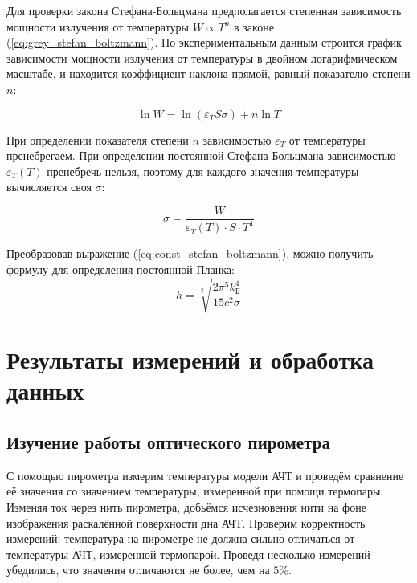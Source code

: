 \documentclass[a4paper, 12pt]{article}
\begin{document}
    Для проверки закона Стефана-Больцмана предполагается степенная зависимость мощности излучения от температуры $W \propto T^n$ в законе (\ref{eq:grey_stefan_boltzmann}). По экспериментальным данным строится график зависимости мощности излучения от температуры в двойном логарифмическом масштабе, и находится коэффициент наклона прямой, равный показателю степени $n$:
    
    \begin{equation}
        \ln W = \ln (\varepsilon_T S \sigma) + n \ln T
        \label{eq:lin_grey_stefan_boltzmann}
    \end{equation}
    
    При определении показателя степени $n$ зависимостью $\varepsilon_T$ от температуры пренебрегаем. При определении постоянной Стефана-Больцмана зависимостью $\varepsilon_T(T)$ пренебречь нельзя, поэтому для каждого значения температуры вычисляется своя $\sigma$:
    
    \begin{equation}
        \sigma = \frac{W}{\varepsilon_T(T) \cdot S \cdot T^4}
        \label{eq:calc_const_stefan_boltzman}
    \end{equation}
    
    Преобразовав выражение (\ref{eq:const_stefan_boltzmann}), можно получить формулу для определения постоянной Планка:
    \begin{equation}
        h = \sqrt[3]{\frac{2 \pi^5 k_Б^4}{15 c^2 \sigma}}
        \label{eq:calc_const_planck}
    \end{equation}

    \newpage
	
    \section{Результаты измерений и обработка данных}

    \subsection{Изучение работы оптического пирометра}

    С помощью пирометра измерим температуры модели АЧТ и проведём сравнение её значения со значением температуры, измеренной при помощи термопары. Изменяя ток через нить пирометра, добьёмся исчезновения нити на фоне изображения раскалённой поверхности дна АЧТ. Проверим корректность измерений: температура на пирометре не должна сильно отличаться от температуры АЧТ, измеренной термопарой. Проведя несколько измерений убедились, что значения отличаются не более, чем на $5\%$.
	
\end{document}
